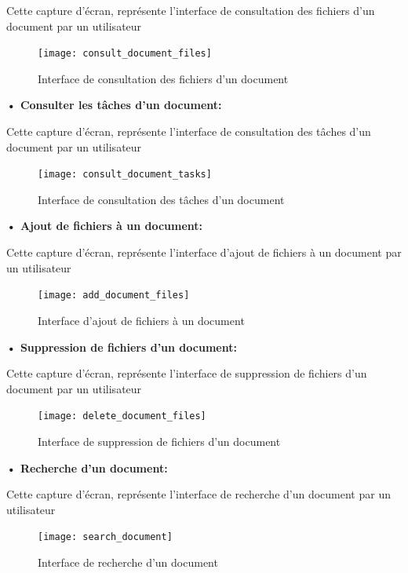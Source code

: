 Cette capture d'écran, représente l'interface de consultation des fichiers d'un document par un utilisateur

\begin{figure}[H]
  \centering
  \texttt{[image: consult\_document\_files]}
  \caption{Interface de consultation des fichiers d'un document}
  \label{fig:consult_document_files}
\end{figure}

\textbf{•	Consulter les tâches d'un document:}

Cette capture d'écran, représente l'interface de consultation des tâches d'un document par un utilisateur

\begin{figure}[H]
  \centering
  \texttt{[image: consult\_document\_tasks]}
  \caption{Interface de consultation des tâches d'un document}
  \label{fig:consult_document_tasks}
\end{figure}

\textbf{•	Ajout de fichiers à un document:}

Cette capture d'écran, représente l'interface d'ajout de fichiers à un document par un utilisateur

\begin{figure}[H]
  \centering
  \texttt{[image: add\_document\_files]}
  \caption{Interface d'ajout de fichiers à un document}
  \label{fig:add_document_files}
\end{figure}

\textbf{• Suppression de fichiers d'un document:}

Cette capture d'écran, représente l'interface de suppression de fichiers d'un document par un utilisateur

\begin{figure}[H]
  \centering
  \texttt{[image: delete\_document\_files]}
  \caption{Interface de suppression de fichiers d'un document}
  \label{fig:delete_document_files}
\end{figure}


\textbf{•	Recherche d'un document:}

Cette capture d'écran, représente l'interface de recherche d'un document par un utilisateur

\begin{figure}[H]
  \centering
  \texttt{[image: search\_document]}
  \caption{Interface de recherche d'un document}
  \label{fig:search_document}
\end{figure}

